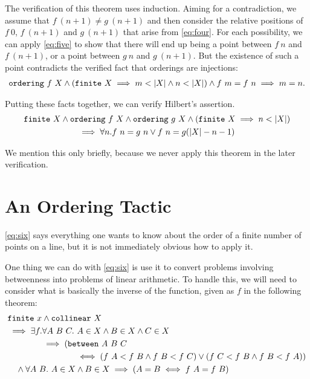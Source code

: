 The verification of this theorem uses induction. Aiming for a contradiction, we assume that $f\ (n+1) \neq g\ (n+1)$ and then consider the relative positions of $f\ 0$, $f\ (n+1)$ and $g\ (n+1)$ that arise from \ref{eq:four}. For each possibility, we can apply \ref{eq:five} to show that there will end up being a point between $f\ n$ and $f\ (n+1)$, or a point between $g\ n$ and $g\ (n+1)$. But the existence of such a point contradicts the verified fact that orderings are injections:
\begin{multline}
  \texttt{ordering}\ f\ X \wedge (\texttt{finite}\ X \implies m < |X| \wedge n < |X|) \wedge f\ m = f\ n \implies m=n.
\end{multline}

Putting these facts together, we can verify Hilbert's assertion.
\begin{multline}
  \texttt{finite}\ X \wedge \texttt{ordering}\ f\ X \wedge \texttt{ordering}\ g\ X \wedge (\texttt{finite}\ X \implies n < |X|)\\
  \implies \forall n. f\ n = g\ n \vee f\ n = g (|X| - n - 1)
\end{multline}

We mention this only briefly, because we never apply this theorem in the later verification.

\section{An Ordering Tactic}
\ref{eq:six} says everything one wants to know about the order of a finite number of points on a line, but it is not immediately obvious how to apply it.

One thing we can do with \ref{eq:six} is use it to convert problems involving betweenness into problems of linear arithmetic. To handle this, we will need to consider what is basically the inverse of the  function, given as $f$ in the following theorem:
\begin{equation}
\label{eq:OrderInverse}
\begin{split}
  &\texttt{finite}\ x \wedge \texttt{collinear}\ X\\
  &\implies \exists f. \forall A\ B\ C.\ A \in X \wedge B \in X \wedge C \in X \\
  &\qquad\qquad\implies (\texttt{between}\ A\ B\ C \\
  &\qquad\qquad\qquad\qquad\iff (f\ A < f\ B \wedge f\ B < f\ C) \vee (f\ C < f\ B \wedge f\ B < f\ A))\\
  &\quad\wedge \forall A\ B.\ A \in X \wedge B \in X \implies (A = B \iff f\ A = f\ B)
\end{split}
\end{equation}

